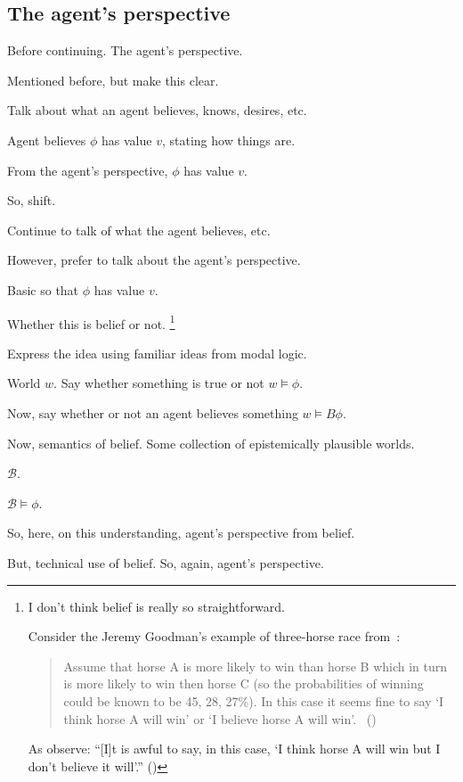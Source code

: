 \subsection{The agent's perspective}
\label{cha:introduction:sec:agents-perspective}

\begin{note}
  Before continuing.
  The agent's perspective.

  Mentioned before, but make this clear.
\end{note}

\begin{note}
  Talk about what an agent believes, knows, desires, etc.

  Agent believes \(\phi\) has value \(v\), stating how things are.

  From the agent's perspective, \(\phi\) has value \(v\).

  So, shift.

  Continue to talk of what the agent believes, etc.

  However, prefer to talk about the agent's perspective.

  Basic so that \(\phi\) has value \(v\).

  Whether this is belief or not.%
  \footnote{
    \label{fn:belief-is-difficult}
    I don't think belief is really so straightforward.

    Consider the Jeremy Goodman's example of three-horse race from~\textcite{Hawthorne:2016wv}:
    \begin{quote}
      Assume that horse A is more likely to win than horse B which in turn is more likely to win then horse C (so the probabilities of winning could be known to be 45, 28, 27\%).
      In this case it seems ﬁne to say `I think horse A will win' or `I believe horse A will win'.%
      \mbox{ }\hfill\mbox{(\citeyear[1440]{Hawthorne:2016wv})}
    \end{quote}
    As \citeauthor{Hawthorne:2016wv} observe: ``[I]t is awful to say, in this case, `I think horse A will win but I don't believe it will'.''
    (\citeyear[1440, fn.17]{Hawthorne:2016wv})
  }
\end{note}

\begin{note}
  Express the idea using familiar ideas from modal logic.

  World \(w\).
  Say whether something is true or not \(w \vDash \phi\).

  Now, say whether or not an agent believes something \(w \vDash B\phi\).

  Now, semantics of belief.
  Some collection of epistemically plausible worlds.

  \(\mathcal{B}\).

  \(\mathcal{B} \vDash \phi\).

  So, here, on this understanding, agent's perspective from belief.

  But, technical use of belief.
  So, again, agent's perspective.
\end{note}

